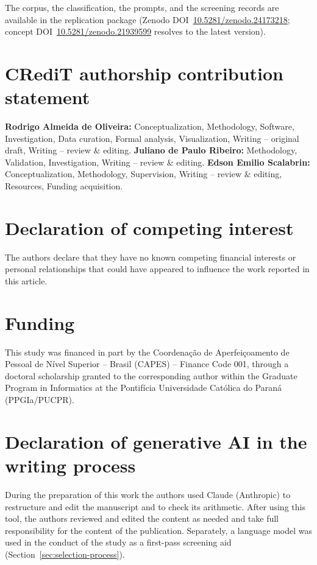 \documentclass[preprint,12pt,authoryear=false]{elsarticle}
\begin{document}
The corpus, the classification, the prompts, and the screening records are available in the replication package (Zenodo DOI~\href{https://doi.org/10.5281/zenodo.24173218}{10.5281/zenodo.24173218}; concept DOI~\href{https://doi.org/10.5281/zenodo.21939599}{10.5281/zenodo.21939599} resolves to the latest version).

\section*{CRediT authorship contribution statement}
\textbf{Rodrigo Almeida de Oliveira:} Conceptualization, Methodology, Software, Investigation, Data curation, Formal analysis, Visualization, Writing -- original draft, Writing -- review \& editing.
\textbf{Juliano de Paulo Ribeiro:} Methodology, Validation, Investigation, Writing -- review \& editing.
\textbf{Edson Emilio Scalabrin:} Conceptualization, Methodology, Supervision, Writing -- review \& editing, Resources, Funding acquisition.

\section*{Declaration of competing interest}
The authors declare that they have no known competing financial interests or personal relationships that could have appeared to influence the work reported in this article.

\section*{Funding}
This study was financed in part by the Coordenação de Aperfeiçoamento de Pessoal de Nível Superior -- Brasil (CAPES) -- Finance Code 001, through a doctoral scholarship granted to the corresponding author within the Graduate Program in Informatics at the Pontifícia Universidade Católica do Paraná (PPGIa/PUCPR).

\section*{Declaration of generative AI in the writing process}
During the preparation of this work the authors used Claude (Anthropic) to restructure and edit the manuscript and to check its arithmetic. After using this tool, the authors reviewed and edited the content as needed and take full responsibility for the content of the publication. Separately, a language model was used in the conduct of the study as a first-pass screening aid (Section~\ref{sec:selection-process}).
\end{document}
